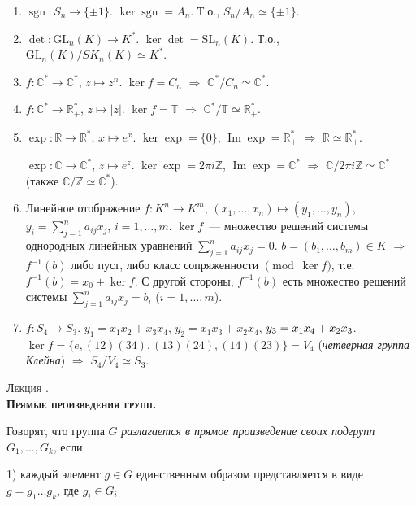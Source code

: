 \documentclass[a4paper]{article}
\newcounter{lec}
\renewcommand{\thelec}{\Roman{lec}}
\newcommand*{\lecture}[1]{\refstepcounter{lec}\vspace{20pt}
\begin{center}{\rmfamily\textsc{Лекция \thelec. \\ \textbf{#1}}}\vspace{5pt}
\end{center}}
\newcommand{\sgn}{\mathop{\mathrm{sgn}}\nolimits}
\renewcommand{\Im}{\mathop{\mathrm{Im}}\nolimits}
\newcommand*{\p}[1]{#1\nobreak\discretionary{}{\hbox{$\mathsurround=0pt #1$}}{}}
\begin{document}
\prim
\begin{enumerate}
  \item $\sgn\colon S_n\to \{\pm1\}$. $\ker \sgn=A_n$. Т.о., $S_n/A_n\simeq
  \{\pm1\}$.
  \item $\det\colon \mathrm{GL}_n(K)\to K^*$. $\ker \det = \mathrm{SL}_n(K)$.
  Т.о., $\mathrm{GL}_n(K)/SK_n(K)\simeq K^*$.
  \item $f\colon \mathbb{C}^*\to\mathbb{C}^*$, $z\mapsto z^n$. $\ker
  f=C_n$ $\Rightarrow$ $\mathbb{C}^*/C_n\simeq \mathbb{C}^*$.
  \item $f\colon \mathbb{C}^*\to\mathbb{R}^*_+$, $z\mapsto |z|$. $\ker
  f=\mathbb{T}$ $\Rightarrow$ $\mathbb{C}^*/\mathbb{T}\simeq
  \mathbb{R}^*_+$.
  \item $\exp\colon \mathbb{R}\to\mathbb{R}^*$, $x\mapsto e^x$. $\ker
  \exp=\{0\}$, $\Im \exp=\mathbb{R}^*_+$ $\Rightarrow$ $\mathbb{R}\simeq
  \mathbb{R}^*_+$.

  $\exp\colon \mathbb{C}\to\mathbb{C}^*$, $z\mapsto e^z$. $\ker \exp=2\pi
  i\mathbb{Z}$, $\Im \exp=\mathbb{C}^*$ $\Rightarrow$ $\mathbb{C}/2\pi i\mathbb{Z}\simeq
  \mathbb{C}^*$ (также $\mathbb{C}/\mathbb{Z}\simeq \mathbb{C^*}$).
  \item Линейное отображение $f\colon K^n\to K^m$,
  $(x_1,\ldots,x_n)\mapsto (y_1,\ldots,y_n)$,
  $y_i=\sum\limits_{j=1}^na_{ij}x_j$, $i=1,\ldots,m$. $\ker f$~---
  множество решений системы однородных линейных уравнений
  $\sum\limits_{j=1}^na_{ij}x_j=0$. $b=(b_1,\ldots,b_m)\in K$
  $\Rightarrow$ $f^{-1}(b)$ либо пуст, либо класс сопряженности $\pmod{\ker
  f}$, т.е. $f^{-1}(b)=x_0+\ker f$. С другой стороны, $f^{-1}(b)$
  есть множество решений системы $\sum\limits_{j=1}^na_{ij}x_j=b_i$
  ($i=1,\ldots,m$).
  \item $f\colon S_4\to S_3$. $y_1=x_1x_2+x_3x_4$,
  $y_2=x_1x_3+x_2x_4$, $y_3=x_1x_4\p+x_2x_3$. $\ker f=\{e, (12)(34), (13)(24),
  (14)(23)\}=V_4$ (\emph{четверная группа Клейна}) $\Rightarrow$ $S_4/V_4\simeq
  S_3$.
\end{enumerate}
\lecture{Прямые произведения групп.}

Говорят, что группа $G$ \emph{разлагается в прямое произведение
своих подгрупп $G_1,\ldots,G_k$}, если

1) каждый элемент $g\in G$ единственным образом представляется в
виде $g=g_1\ldots g_k$, где $g_i\in G_i$
\end{document}
